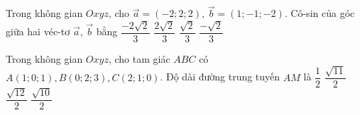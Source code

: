\begin{ex}%
	Trong không gian $ Oxyz $, cho $ \vec{a}=(-2;2;2) $, $ \vec{b}=(1;-1;-2) $. Cô-sin của góc giữa hai véc-tơ $ \vec{a} $, $ \vec{b} $ bằng
	\choice
	{\True $ \dfrac{-2\sqrt{2}}{3} $}
	{$ \dfrac{2\sqrt{2}}{3} $}
	{$ \dfrac{\sqrt{2}}{3} $}
	{$ \dfrac{-\sqrt{2}}{3} $}
\end{ex}
\begin{ex}%
	Trong không gian $Oxyz$, cho tam giác $ABC$ có $A\left(1;0;1\right)	, B\left(0;2;3\right), C\left(2;1;0\right)$. Độ dài đường trung tuyến $AM$ là 
	\choice
	{$\dfrac{1}{2}$}
	{$\dfrac{\sqrt{11}}{2}$}
	{$\dfrac{\sqrt{12}}{2}$}
	{\True$\dfrac{\sqrt{10}}{2}$}	
\end{ex}
